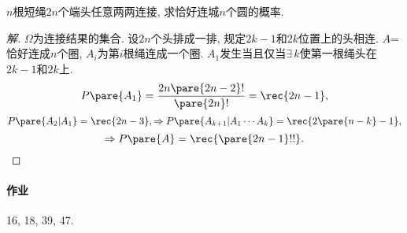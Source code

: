 \documentclass[../Statistics.tex]{subfiles}
\begin{document}
\begin{sample}
    \begin{ex}
        \label{ex:nn结绳问题}
        $n$根短绳$2n$个端头任意两两连接, 求恰好连城$n$个圆的概率.
    \end{ex}
    \begin{proof}[解]
        $\Omega$为连接结果的集合. 设$2n$个头排成一排, 规定$2k-1$和$2k$位置上的头相连. $A$=恰好连成$n$个圈, $A_i$为第$i$根绳连成一个圈. $A_1$发生当且仅当$\exists\, k$使第一根绳头在$2k-1$和$2k$上.
        \[ P\pare{A_1} = \frac{2n\pare{2n-2}!}{\pare{2n}!} = \rec{2n-1}, \]
        \[ P\pare{A_2\vert A_1} = \rec{2n-3}, \Rightarrow P\pare{A_{k+1}\vert A_1\cdots A_k} = \rec{2\pare{n-k}-1}, \]
        \[ \Rightarrow P\pare{A} = \rec{\pare{2n-1}!!}. \qedhere \]
    \end{proof}
\end{sample}
\paragraph{作业} %
\label{par:作业}

16, 18, 39, 47.

\end{document}
